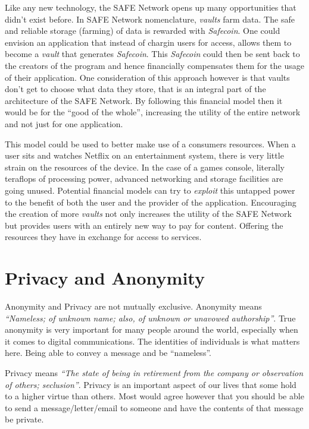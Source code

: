Like any new technology, the SAFE Network opens up many opportunities that didn't exist before. In SAFE Network nomenclature, \textit{vaults} farm data. The safe and reliable storage (farming) of data is rewarded with \textit{Safecoin}. One could envision an application that instead of chargin users for access, allows them to become a \textit{vault} that generates \textit{Safecoin}. This \textit{Safecoin} could then be sent back to the creators of the program and hence financially compensates them for the usage of their application. One consideration of this approach however is that vaults don't get to choose what data they store, that is an integral part of the architecture of the SAFE Network. By following this financial model then it would be for the ``good of the whole'', increasing the utility of the entire network and not just for one application.

This model could be used to better make use of a consumers resources. When a user sits and watches Netflix on an entertainment system, there is very little strain on the resources of the device. In the case of a games console, literally teraflops of processing power, advanced networking and storage facilities are going unused. Potential financial models can try to \textit{exploit} this untapped power to the benefit of both the user and the provider of the application. Encouraging the creation of more \textit{vaults} not only increases the utility of the SAFE Network but provides users with an entirely new way to pay for content. Offering the resources they have in exchange for access to services.

\section{Privacy and Anonymity}

Anonymity and Privacy are not mutually exclusive. Anonymity means \textit{``Nameless; of unknown name; also, of unknown or unavowed authorship''}\cite{anonymous}. True anonymity is very important for many people around the world, especially when it comes to digital communications. The identities of individuals is what matters here. Being able to convey a message and be ``nameless''. 

Privacy means \textit{``The state of being in retirement from the company or observation of others; seclusion''}\cite{privacy}. Privacy is an important aspect of our lives that some hold to a higher virtue than others. Most would agree however that you should be able to send a message/letter/email to someone and have the contents of that message be private.

